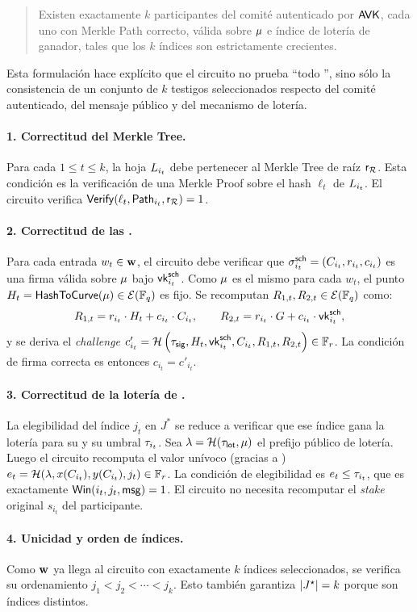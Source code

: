 \begin{quote}
	Existen exactamente $k$ participantes del comité autenticado por $\mathsf{AVK}$, cada uno con Merkle Path correcto, \UniqueSchnorrSignature válida sobre $\mu$ e índice de lotería de \Mithril ganador, tales que los $k$ índices son estrictamente crecientes.
\end{quote}

Esta formulación hace explícito que el circuito no prueba ``todo \Mithril'', sino sólo la consistencia de un conjunto de \(k\) testigos seleccionados respecto del comité autenticado, del mensaje público y del mecanismo de lotería.

\paragraph{1. Correctitud del Merkle Tree.}
Para cada $1 \leq t \leq k$, la hoja $L_{i_t}$ debe pertenecer al Merkle Tree de raíz $\mathsf{r}_{\mathcal{R}}$. Esta condición es la verificación de una Merkle Proof sobre el hash $\ell_t$ de $L_{i_t}$. El circuito verifica $\mathsf{Verify}(\ell_t, \mathsf{Path}_{i_t}, \mathsf{r}_{\mathcal{R}}) = 1$.

\paragraph{2. Correctitud de las \UniqueSchnorrSignature.}
Para cada entrada $w_t \in \mathbf{w}$, el circuito debe verificar que $\sigma^{\mathsf{sch}}_{i_t} = (C_{i_t},r_{i_t},c_{i_t})$ es una firma válida sobre $\mu$ bajo $\mathsf{vk}^{\mathsf{sch}}_{i_t}$. Como $\mu$ es el mismo para cada $w_t$, el punto $H_t = \textsf{HashToCurve}(\mu) \in \mathcal{E}(\mathbb{F}_q)$ es fijo. Se recomputan $R_{1,t}, R_{2, t} \in \mathcal{E}(\mathbb{F}_q)$ como:
$$R_{1, t} = r_{i_t} \cdot H_t + c_{i_t} \cdot C_{i_t}, \qquad R_{2,t} = r_{i_t} \cdot G + c_{i_t} \cdot \mathsf{vk}^{\mathsf{sch}}_{i_t},$$
y se deriva el \textit{challenge} $c'_{i_t} = \mathcal{H} \left(\tau_{\mathsf{sig}}, H_t, \mathsf{vk}^{\mathsf{sch}}_{i_t}, C_{i_t}, R_{1,t}, R_{2,t} \right) \in \mathbb{F}_r$. La condición de firma correcta es entonces $c_{i_t} = c'_{i_t}$.

\paragraph{3. Correctitud de la lotería de \Mithril.}
La elegibilidad del índice $j_t$ en $J^*$ se reduce a verificar que ese índice gana la lotería para su \UniqueSchnorrSignature y su umbral $\tau_{i_t}$. Sea $\lambda = \mathcal{H}(\tau_{\mathsf{lot}}, \mu)$ el prefijo público de lotería. Luego el circuito recomputa el valor unívoco (gracias a \UniqueSchnorrSignature) $e_t = \mathcal{H}(\lambda, x(C_{i_t}), y(C_{i_t}), j_t) \in \mathbb{F}_r$. La condición de elegibilidad es $e_t \leq \tau_{i_t}$, que es exactamente  $\mathsf{Win}(i_t,j_t,\mathsf{msg}) = 1$. El circuito no necesita recomputar el \textit{stake} original $s_{i_t}$ del participante.

\paragraph{4. Unicidad y orden de índices.}
Como $\mathbf{w}$ ya llega al circuito con exactamente $k$ índices seleccionados, se verifica su ordenamiento $j_1 < j_2 < \cdots < j_k$. Esto también garantiza $|J^{\star}| = k$ porque son índices distintos.
